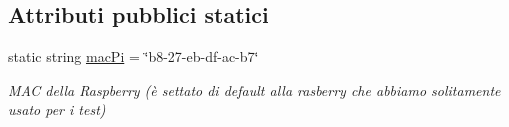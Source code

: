 \subsection*{Attributi pubblici statici}
\begin{DoxyCompactItemize}
\item 
\mbox{\label{classclient__app_1_1_main_window_a345948e37978ea2565f3eb2913494c5c}} 
static string \mbox{\hyperlink{classclient__app_1_1_main_window_a345948e37978ea2565f3eb2913494c5c}{mac\+Pi}} = \char`\"{}b8-\/27-\/eb-\/df-\/ac-\/b7\char`\"{}
\begin{DoxyCompactList}\small\item\em M\+AC della Raspberry (è settato di default alla rasberry che abbiamo solitamente usato per i test) \end{DoxyCompactList}\end{DoxyCompactItemize}
